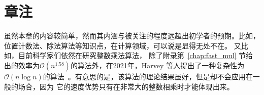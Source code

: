 \section*{章注}
虽然本章的内容较简单，然而其内涵与被关注的程度远超出初学者的预期。比如，位置计数法、除法算法等知识点，在计算领域，可以说是显得无处不在。
又比如，目前科学家们依然在研究整数乘法算法，
除了附录第~\ref{chap:fast_mul} 节给出的效率为$\mathcal{O}(n^{1.58})$的算法外，在2021年，Harvey 等人提出了一种复杂性为$\mathcal{O}(n \log n)$的算法~\cite{harvey2021integer}。有意思的是，该算法的理论结果虽好，但是却不会应用在一般的场合，因为
它的速度优势只有在非常大的整数相乘时才能体现出来。


